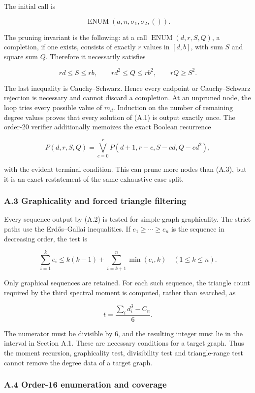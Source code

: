 \documentclass[
  english,
  11pt,
  a4paper,
]{article}
\begin{document}
The initial call is

\[
\operatorname{ENUM}(a,n,\sigma_1,\sigma_2,()).
\tag{A.2}
\]

The pruning invariant is the following: at a call
\(\operatorname{ENUM}(d,r,S,Q)\), a completion, if one exists, consists
of exactly \(r\) values in \([d,b]\), with sum \(S\) and square sum
\(Q\). Therefore it necessarily satisfies

\[
rd\le S\le rb,
\qquad
rd^2\le Q\le rb^2,
\qquad
rQ\ge S^2.
\tag{A.3}
\]

The last inequality is Cauchy--Schwarz. Hence every endpoint or
Cauchy--Schwarz rejection is necessary and cannot discard a completion.
At an unpruned node, the loop tries every possible value of \(m_d\).
Induction on the number of remaining degree values proves that every
solution of (A.1) is output exactly once. The order-20 verifier
additionally memoizes the exact Boolean recurrence

\[
P(d,r,S,Q)
=\bigvee_{c=0}^{r}P(d+1,r-c,S-cd,Q-cd^2),
\tag{A.4}
\]

with the evident terminal condition. This can prune more nodes than
(A.3), but it is an exact restatement of the same exhaustive case split.

\subsubsection{A.3 Graphicality and forced triangle
filtering}\label{a.3-graphicality-and-forced-triangle-filtering}

Every sequence output by (A.2) is tested for simple-graph graphicality.
The strict paths use the Erdős--Gallai inequalities. If
\(e_1\ge\cdots\ge e_n\) is the sequence in decreasing order, the test is

\[
\sum_{i=1}^{k}e_i
\le k(k-1)+\sum_{i=k+1}^{n}\min(e_i,k)
\quad(1\le k\le n).
\tag{A.5}
\]

Only graphical sequences are retained. For each such sequence, the
triangle count required by the third spectral moment is computed, rather
than searched, as

\[
t=\frac{\sum_i d_i^3-C_n}{6}.
\tag{A.6}
\]

The numerator must be divisible by 6, and the resulting integer must lie
in the interval in Section A.1. These are necessary conditions for a
target graph. Thus the moment recursion, graphicality test, divisibility
test and triangle-range test cannot remove the degree data of a target
graph.

\subsubsection{A.4 Order-16 enumeration and
coverage}\label{a.4-order-16-enumeration-and-coverage}
\end{document}
